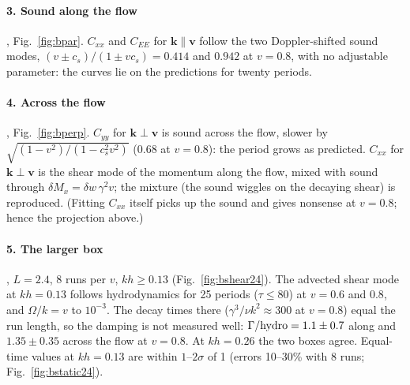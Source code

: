 \documentclass[11pt,aps,preprint,nofootinbib,superscriptaddress,tightenlines]{revtex4-2}
\def\Fig#1{Fig.~\ref{#1}}
\let\oldparagraph\paragraph
\renewcommand{\paragraph}{\par\bigskip\oldparagraph}
\begin{document}
\paragraph{3. Sound along the flow}, \Fig{fig:bpar}.  $C_{xx}$ and $C_{EE}$ for $\bm k\parallel\bm v$ follow the
two Doppler-shifted sound modes, $(v\pm c_s)/(1\pm vc_s)=0.414$ and $0.942$ at $v=0.8$, with no adjustable
parameter: the curves lie on the predictions for twenty periods.

\paragraph{4. Across the flow}, \Fig{fig:bperp}.  $C_{yy}$ for $\bm k\perp\bm v$ is sound across the flow, slower
by $\sqrt{(1-v^2)/(1-c_s^2v^2)}$ ($0.68$ at $v=0.8$): the period grows as predicted.  $C_{xx}$ for $\bm k\perp\bm v$
is the shear mode of the momentum along the flow, mixed with sound through $\delta M_x=\delta w\,\gamma^2v$; the
mixture (the sound wiggles on the decaying shear) is reproduced.  (Fitting $C_{xx}$ itself picks up the
sound and gives nonsense at $v=0.8$; hence the projection above.)

\paragraph{5. The larger box}, $L=2.4$, 8 runs per $v$, $kh\ge0.13$ (\Fig{fig:bshear24}).  The advected shear
mode at $kh=0.13$ follows hydrodynamics for 25 periods ($\tau\le80$) at $v=0.6$ and $0.8$, and $\Omega/k=v$ to
$10^{-3}$.  The decay times there ($\gamma^3/\nu k^2\approx300$ at $v=0.8$) equal the run length, so the damping is
not measured well: $\Gamma/{\rm hydro}=1.1\pm0.7$ along and $1.35\pm0.35$ across the flow at $v=0.8$.  At $kh=0.26$
the two boxes agree.  Equal-time values at $kh=0.13$ are within $1$--$2\sigma$ of 1 (errors 10--30\% with 8
runs; \Fig{fig:bstatic24}).
\end{document}
